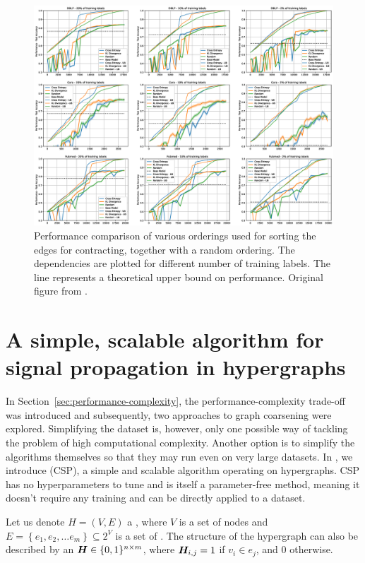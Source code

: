 \begin{figure}
	\includegraphics[width=\linewidth]{images/direct-graph-coarsening-results.eps}
	\caption{Performance comparison of various orderings used for sorting the edges for contracting, together with a random ordering. The dependencies are plotted for different number of training labels. The line represents a theoretical upper bound on performance. Original figure from \cite{prochazka_scalable_2022}.}
	\label{fig:direct-graph-coarsening-results}
\end{figure}

\section{A simple, scalable algorithm for signal propagation in hypergraphs}
\label{sec:CSP}

In Section~\ref{sec:performance-complexity}, the performance-complexity trade-off was introduced and subsequently, two approaches to graph coarsening were explored. Simplifying the dataset is, however, only one possible way of tackling the problem of high computational complexity. Another option is to simplify the algorithms themselves so that they may run even on very large datasets. In \cite{prochazka_convolutional_2024}, we introduce  (CSP), a simple and scalable algorithm operating on hypergraphs. CSP has no hyperparameters to tune and is itself a parameter-free method, meaning it doesn't require any training and can be directly applied to a dataset.

Let us denote \( H = \left( V, E \right) \) a , where \( V \) is a set of nodes and \( E = \left\{ e_1, e_2, \dots e_m \right\} \subseteq 2^V \) is a set of . The structure of the hypergraph can also be described by an  \( \bm{H} \in \{ 0, 1 \}^{n \times m}\), where \( \bm{H}_{i, j} = 1 \) if \( v_i \in e_j \), and \( 0 \) otherwise.

